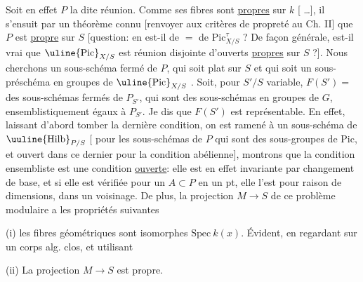 Soit en effet $P$ la dite réunion. Comme
ses fibres sont \uline{propres} sur $k$ [ \ldots],
il s'ensuit  par un théorème connu
[renvoyer aux critères de propreté au Ch. II]
que $P$ est \uline{propre} sur $S$ [question:
en est-il de $=$ de $\mathrm{Pic}^{\tau}_{X/S}$ ? De façon
générale, est-il vrai que $\uline{\mathrm{Pic}}_{X/S}$ est
réunion disjointe d'ouverts \uline{propres} sur
$S$ ?]. Nous cherchons un sous-schéma
fermé de $P$, qui soit plat sur $S$ et
qui soit un sous-préschéma en groupes
de $\uline{\mathrm{Pic}}_{X/S}$ .  Soit, pour $S'/S$
variable, $F(S')=$  des sous-schémas
fermés de $P_{S'}$, qui sont des sous-schémas
en groupes de $G$,  ensemblistiquement
égaux à $P_{S'}$. Je dis que  $F(S')$
est représentable. En effet, laissant d'abord
tomber la dernière condition, on est
ramené à un sous-schéma  de
$\uuline{\mathrm{Hilb}}_{P/S}$ [ pour les sous-schémas de $P$
qui sont des sous-groupes de $\mathrm{Pic}$, et
ouvert dans ce dernier pour la condition
abélienne], montrons que la condition
ensembliste est une condition\unsure{,|\,} \uline{ouverte}:
elle est en effet invariante par changement
de base, et si elle est
vérifiée pour un $A\subset P$ en un pt,
elle l'est pour raison de dimensions,
dans un voisinage. De plus,
la projection $M\to S$ de ce problème
modulaire a les propriétés suivantes

(i) les fibres géométriques sont isomorphes 
 $\mathrm{Spec}\ k(x)$. Évident, en regardant
sur un corps alg. clos, et utilisant 

(ii) La projection $M\to S$ est propre.

